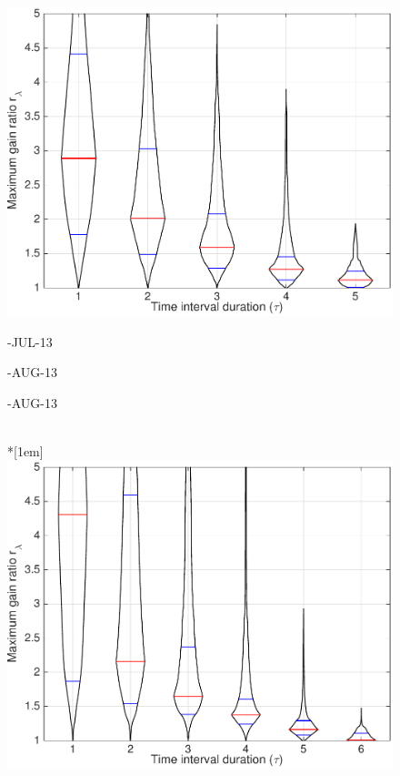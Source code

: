 \begin{figure}
\includegraphics[width=\mylength]{dist/20130823-maxGain-local-relativePerf} \\
\parbox{\mylength}{-JUL-13}
\parbox{\mylength}{-AUG-13}
\parbox{\mylength}{-AUG-13} \\*[1em]
\includegraphics[width=\mylength]{dist/20130824-maxGain-local-relativePerf}

\end{figure}
